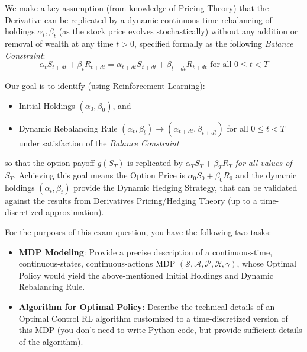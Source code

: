 \documentclass[12pt]{exam}
\begin{document}
\begin{questions}
We make a key assumption (from knowledge of Pricing Theory) that the Derivative can be replicated by a dynamic continuous-time rebalancing of holdings $\alpha_t, \beta_t$ (as the stock price evolves stochastically) without any addition or removal of wealth at any time $t > 0$, specified formally as the following {\em Balance Constraint}: 
$$\alpha_t S_{t+dt} + \beta_t R_{t+dt} = \alpha_{t+dt} S_{t+dt} + \beta_{t+dt} R_{t+dt} \mbox{ for all } 0 \leq t < T$$

Our goal is to identify (using Reinforcement Learning):
\begin{itemize}
\item  Initial Holdings $(\alpha_0, \beta_0)$, and
\item Dynamic Rebalancing Rule $(\alpha_t, \beta_t) \rightarrow (\alpha_{t+dt}, \beta_{t+dt})$ for all
$0 \leq t < T$ under satisfaction of the {\em Balance Constraint}
\end{itemize}
so that the option payoff $g(S_T)$ is replicated by $\alpha_T S_T + \beta_T R_T$ {\em for all values of $S_T$}. Achieving this goal means the Option Price is $\alpha_0 S_0 + \beta_0 R_0$ and the dynamic holdings $(\alpha_t, \beta_t)$ provide the Dynamic Hedging Strategy, that can be validated against the results from Derivatives Pricing/Hedging Theory (up to a time-discretized approximation).

For the purposes of this exam question, you have the following two tasks:

\begin{itemize}
\item {\bf MDP Modeling}: Provide a precise description of a continuous-time, continuous-states, continuous-actions MDP $(\mathcal{S}, \mathcal{A}, \mathcal{P}, \mathcal{R}, \gamma)$, whose Optimal Policy would yield the above-mentioned Initial Holdings and Dynamic Rebalancing Rule.
\item {\bf Algorithm for Optimal Policy}:  Describe the technical details of an Optimal Control RL algorithm customized to a time-discretized version of this MDP (you don't need to write Python code, but provide sufficient details of the algorithm).
\end{itemize}

 


\end{questions}
\end{document}
